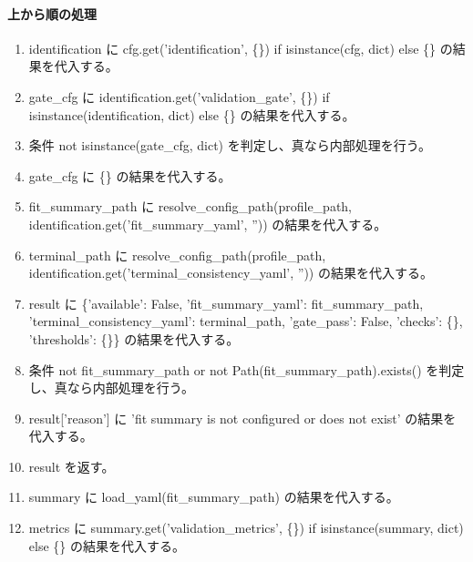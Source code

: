 \documentclass[a4paper,11pt]{article}
\begin{document}
            \paragraph{上から順の処理}
            \begin{enumerate}[leftmargin=1.8em]
            \item identification に cfg.get('identification', \{\}) if isinstance(cfg, dict) else \{\} の結果を代入する。
\item gate\_cfg に identification.get('validation\_gate', \{\}) if isinstance(identification, dict) else \{\} の結果を代入する。
\item 条件 not isinstance(gate\_cfg, dict) を判定し、真なら内部処理を行う。
\item   gate\_cfg に \{\} の結果を代入する。
\item fit\_summary\_path に resolve\_config\_path(profile\_path, identification.get('fit\_summary\_yaml', '')) の結果を代入する。
\item terminal\_path に resolve\_config\_path(profile\_path, identification.get('terminal\_consistency\_yaml', '')) の結果を代入する。
\item result に \{'available': False, 'fit\_summary\_yaml': fit\_summary\_path, 'terminal\_consistency\_yaml': terminal\_path, 'gate\_pass': False, 'checks': \{\}, 'thresholds': \{\}\} の結果を代入する。
\item 条件 not fit\_summary\_path or not Path(fit\_summary\_path).exists() を判定し、真なら内部処理を行う。
\item   result['reason'] に 'fit summary is not configured or does not exist' の結果を代入する。
\item   result を返す。
\item summary に load\_yaml(fit\_summary\_path) の結果を代入する。
\item metrics に summary.get('validation\_metrics', \{\}) if isinstance(summary, dict) else \{\} の結果を代入する。

\end{enumerate}
\end{document}

